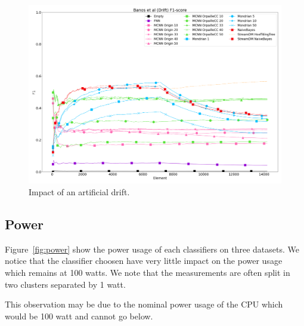 \begin{figure}[H]
	\includegraphics[width=\linewidth]{figures/results/drift_f1.png}
	\caption{Impact of an artificial drift.}
	\label{fig:f1-drift}
\end{figure}

\subsection{Power}
Figure~\ref{fig:power} show the power usage of each classifiers on three
datasets. We notice that the classifier choosen have very little impact on the
power usage which remains at 100 watts. We note that the measurements are often
split in two clusters separated by 1 watt.

This observation may be due to the nominal power usage of the CPU which would
be 100 watt and cannot go below.

